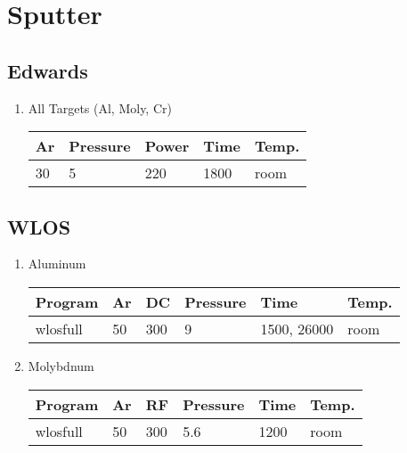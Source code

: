 \section{Sputter}

\subsection{Edwards}

\begin{enumerate}
  
\item All Targets (Al, Moly, Cr)
  \begin{center}
    \begin{tabular}{|l|l|l|l|l|}
      \hline
      Ar & Pressure & Power & Time & Temp. \\ 
      \hline  
      30 & 5 & 220 & 1800 & room \\ 
      \hline 
    \end{tabular}  
    \label{tab:Edwards}
  \end{center}
  
\end{enumerate}

\subsection{WLOS}

\begin{enumerate}
\item Aluminum
  \begin{center}
    \begin{tabular}{|l|l|l|l|l|l|}
      \hline 
      Program & Ar & DC & Pressure & Time & Temp. \\ 
      \hline 
      wlosfull & 50 & 300 & 9 & 1500\footnotemark[5], 26000\footnotemark[6] & room \\ 
      \hline 
    \end{tabular}
    \label{tab:WLOSAl}
  \end{center}
  
\item Molybdnum
  \begin{center}
    \begin{tabular}{|l|l|l|l|l|l|}
      \hline 
      Program & Ar & RF & Pressure & Time & Temp. \\ 
      \hline 
      wlosfull & 50 & 300 & 5.6 & 1200 & room \\ 
      \hline 
    \end{tabular}
    \label{tab:WLOSMo}
  \end{center}  

\end{enumerate}

